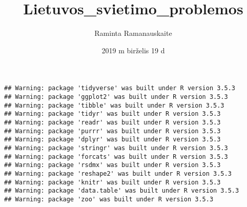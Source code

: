 \documentclass[]{article}
\title{Lietuvos\_svietimo\_problemos}
\author{Raminta Ramanauskaite}
\date{2019 m birželis 19 d}
\begin{document}
\maketitle

\begin{verbatim}
## Warning: package 'tidyverse' was built under R version 3.5.3
## Warning: package 'ggplot2' was built under R version 3.5.3
## Warning: package 'tibble' was built under R version 3.5.3
## Warning: package 'tidyr' was built under R version 3.5.3
## Warning: package 'readr' was built under R version 3.5.3
## Warning: package 'purrr' was built under R version 3.5.3
## Warning: package 'dplyr' was built under R version 3.5.3
## Warning: package 'stringr' was built under R version 3.5.3
## Warning: package 'forcats' was built under R version 3.5.3
## Warning: package 'rsdmx' was built under R version 3.5.3
## Warning: package 'reshape2' was built under R version 3.5.3
## Warning: package 'knitr' was built under R version 3.5.3
## Warning: package 'data.table' was built under R version 3.5.3
## Warning: package 'zoo' was built under R version 3.5.3
\end{verbatim}
\end{document}
